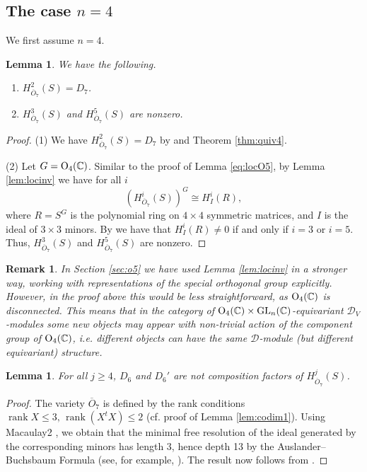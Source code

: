 \documentclass[11pt,reqno]{amsart}
\newcommand{\D}{\mathcal{D}}
\newcommand{\tn}{\textnormal}
\newcommand{\C}{\mathbb{C}}
\newcommand{\GL}{\operatorname{GL}}
\newcommand{\ol}[1]{\overline{#1}}
\newcommand{\op}[1]{\operatorname{#1}}
\newtheorem{lemma}[theorem]{Lemma}
\newtheorem{remark}[theorem]{Remark}
\numberwithin{equation}{section}
\begin{document}
\subsection{The case $n=4$}\label{sec:o7n4}  We first assume $n=4$.



\begin{lemma}\label{lem:firstFactsO7}
We have the following.
\begin{enumerate}
\item $H^2_{\ol{O}_7}(S)=D_7$.
\item $H^3_{\ol{O}_7}(S)	$ and $H^5_{\ol{O}_7}(S)$ are nonzero.
\end{enumerate}
	
\end{lemma}

\begin{proof}
(1) We have $H^2_{\ol{O}_7}(S)=D_7$ by \cite[Lemma 3.11]{lHorincz2019categories} and Theorem \ref{thm:quiv4}.

(2) Let $G=\tn{O}_4(\C)$. Similar to the proof of Lemma \ref{eq:locO5}, by Lemma \ref{lem:locinv} we have for all $i$
\[(H^i_{\ol{O}_7}(S))^G \cong H^i_{I}(R),\]
where $R=S^G$ is the polynomial ring on $4\times 4$ symmetric matrices, and $I$ is the ideal of $3\times 3$ minors. By \cite[(1.5)]{raicu2016ocal} we have that $H^i_{I}(R)\neq 0$ if and only if $i=3$ or $i=5$. Thus, $H^3_{\ol{O}_7}(S)	$ and $H^5_{\ol{O}_7}(S)$ are nonzero.
\end{proof}

\begin{remark}
In Section \ref{sec:o5} we have used Lemma \ref{lem:locinv} in a stronger way, working with representations of the special orthogonal group explicitly. However, in the proof above this would be less straightforward, as $\tn{O}_4(\C)$ is disconnected. This means that in the category of $\tn{O}_4(\C)\times \GL_n(\C)$-equivariant $\D_V$-modules some new objects may appear with non-trivial action of the component group of $\tn{O}_4(\C)$, i.e. different objects can have the same $\D$-module (but different equivariant) structure.
\end{remark}


\begin{lemma}\label{lem:Varbaro}
For all $j\geq 4$, $D_6$ and $D_6'$ are not composition factors of $H^j_{\ol{O}_7}(S)$.
\end{lemma}

\begin{proof}
The variety $\ol{O}_7$ is defined by the rank conditions $\op{rank} X \leq 3, \, \op{rank} (X^t X)\leq 2$ (cf. proof of Lemma \ref{lem:codim1}). Using Macaulay2 \cite{M2}, we obtain that the minimal free resolution of the ideal generated by the corresponding minors has length 3, hence depth 13 by the Auslander--Buchsbaum Formula (see, for example, \cite[Theorem 1.2.7]{weyman}). The result now follows from \cite[Proposition 3.2]{varbaro}.
\end{proof}
\end{document}
